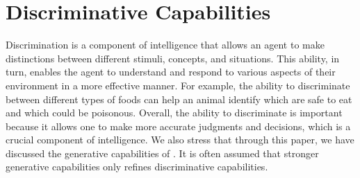 \section{Discriminative Capabilities}
\label{sec:discriminative}


Discrimination is a component of intelligence that allows an agent to make distinctions between different stimuli, concepts, and situations. This ability, in turn, enables the agent to understand and respond to various aspects of their environment in a more effective manner. For example, the ability to discriminate between different types of foods can help an animal identify which are safe to eat and which could be poisonous. Overall, the ability to discriminate is important because it allows one to make more accurate judgments and decisions, which is a crucial component of intelligence. We also stress that through this paper, we have discussed the generative capabilities of \DV. It is often assumed that stronger generative capabilities only refines discriminative capabilities.


